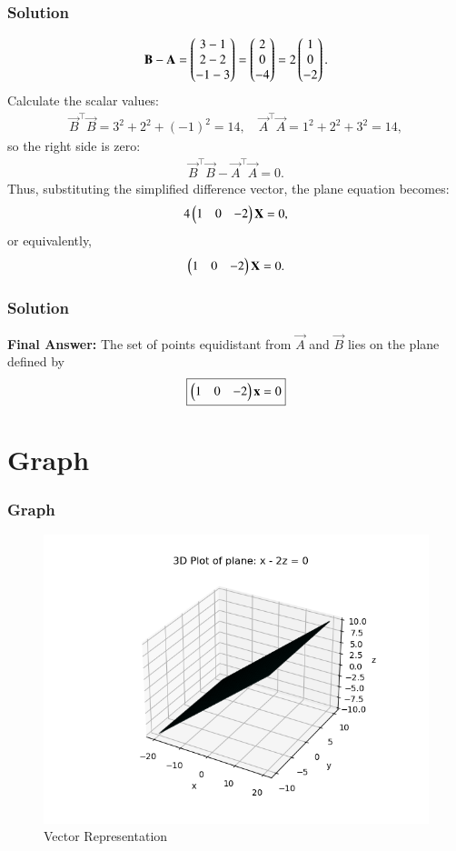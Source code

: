 \documentclass{beamer}
\numberwithin{equation}{section}
\begin{document}
\begin{frame}[fragile]
    \frametitle{Solution}
\begin{align}
\mathbf{B} - \mathbf{A} = \begin{pmatrix}3 - 1 \\ 2 - 2 \\ -1 - 3\end{pmatrix} = \begin{pmatrix}2 \\ 0 \\ -4\end{pmatrix} = 2 \begin{pmatrix}1 \\ 0 \\ -2\end{pmatrix}.
\end{align}
Calculate the scalar values:
\begin{align}
\vec{B}^\top \vec{B} = 3^2 + 2^2 + (-1)^2 = 14, \quad \vec{A}^\top \vec{A} = 1^2 + 2^2 + 3^2 = 14,
\end{align}
so the right side is zero:
\begin{align}
\vec{B}^\top \vec{B} - \vec{A}^\top \vec{A} = 0.
\end{align}
Thus, substituting the simplified difference vector, the plane equation becomes:
\begin{align}
4\begin{pmatrix}1 & 0 & -2\end{pmatrix}\mathbf{X} = 0,
\end{align}
or equivalently,
\begin{align}
\begin{pmatrix}1 & 0 & -2\end{pmatrix}\mathbf{X} = 0.
\end{align}
\end{frame}
\begin{frame}[fragile]
    \frametitle{Solution}

\textbf{Final Answer:} The set of points equidistant from \(\vec{A}\) and \(\vec{B}\) lies on the plane defined by
\[
\boxed{
\begin{pmatrix}1 & 0 & -2\end{pmatrix} \mathbf{x} = 0
}
\]


\end{frame}
\section{Graph}
\begin{frame}
    \frametitle{Graph}
    \begin{figure}[htbp]
    \centering
    \includegraphics[width=0.65\linewidth]{FIG/fig1.png}
    \caption{Vector Representation}
    \label{fig:FIG/fig1.png}
\end{figure}
\end{frame}
\end{document}
